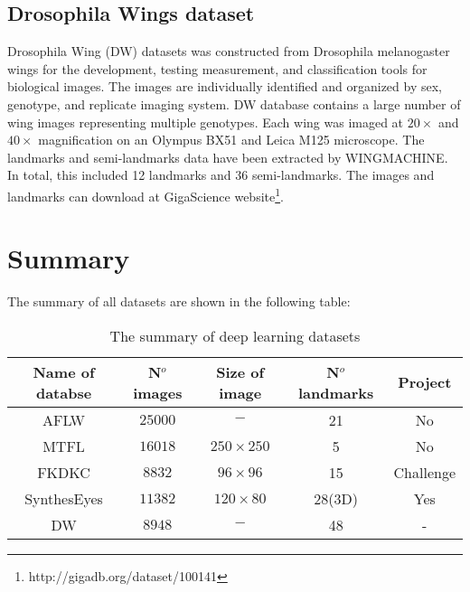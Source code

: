 \subsection{Drosophila Wings dataset}
Drosophila Wing (DW) datasets \cite{sonnenschein2015image} was constructed from Drosophila melanogaster wings for the development, testing measurement, and classification tools for biological images. The images are individually identified and organized by sex, genotype, and replicate imaging system. DW database contains a large number of wing images representing multiple genotypes. Each wing was imaged at $20\times$ and $40\times$ magnification on an Olympus BX51 and Leica M125 microscope. The landmarks and semi-landmarks data have been extracted by WINGMACHINE. In total, this included 12 landmarks and 36 semi-landmarks. The images and landmarks can download at GigaScience website\footnote{http://gigadb.org/dataset/100141}.
\section{Summary}
The summary of all datasets are shown in the following table:\\
\begin{table}[!h]
	\centering
	\begin{tabular}{*{5}{c}}
		Name of databse & N$^{o}$ images & Size of image & N$^{o}$ landmarks & Project \\ \hline
		AFLW & $25000$ & $-$ & 21 & No \\ \hline
		MTFL & $16018$ & $250 \times 250$ & 5 & No \\ \hline
		FKDKC & $8832$ & $96 \times 96$ & 15 & Challenge \\ \hline
		SynthesEyes & $11382$ & $120 \times 80$ & 28(3D) & Yes \\ \hline
		DW & $8948$ & $-$ & 48 & - \\ \hline
	\end{tabular}
	\caption{The summary of deep learning datasets}
	\label{tb4}
\end{table}
